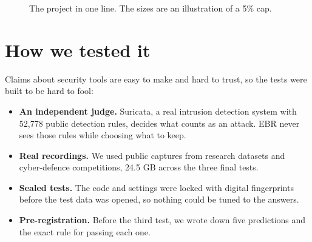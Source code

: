 \begin{figure}[H]
\centering
{}
\caption{The project in one line. The sizes are an illustration of a 5\% cap.}
\end{figure}

\section{How we tested it}
Claims about security tools are easy to make and hard to trust, so the tests were built to be hard to fool:
\begin{itemize}
\item \textbf{An independent judge.} Suricata, a real intrusion detection system with 52,778 public detection rules, decides what counts as an attack. EBR never sees those rules while choosing what to keep.
\item \textbf{Real recordings.} We used public captures from research datasets and cyber-defence competitions, 24.5 GB across the three final tests.
\item \textbf{Sealed tests.} The code and settings were locked with digital fingerprints before the test data was opened, so nothing could be tuned to the answers.
\item \textbf{Pre-registration.} Before the third test, we wrote down five predictions and the exact rule for passing each one.
\end{itemize}

